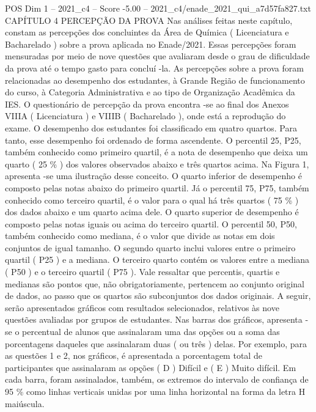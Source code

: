 \begin{textsample}{POS Dim 1 – 2021\_c4 – Score -5.00 – 2021\_c4/enade\_2021\_qui\_a7d57fa827.txt}  \label{ex:f1_pos_378}
CAPÍTULO 4 PERCEPÇÃO DA PROVA Nas análises feitas neste capítulo, constam as percepções dos concluintes da Área de Química ( Licenciatura e Bacharelado ) sobre a prova aplicada no Enade/2021.
Essas percepções foram mensuradas por meio de nove questões que avaliaram desde o grau de dificuldade da prova até o tempo gasto para concluí -la.
As percepções sobre a prova foram relacionadas ao desempenho dos estudantes, à Grande Região de funcionamento do curso, à Categoria Administrativa e ao tipo de Organização Acadêmica da IES.
O questionário de percepção da prova encontra -se ao final dos Anexos VIIIA ( Licenciatura ) e VIIIB ( Bacharelado ), onde está a reprodução do exame.
O desempenho dos estudantes foi classificado em quatro quartos.
Para tanto, esse desempenho foi ordenado de forma ascendente.
O percentil 25, P25, também conhecido como primeiro quartil, é a nota de desempenho que deixa um quarto ( 25 \% ) dos valores observados abaixo e três quartos acima.
Na Figura 1, apresenta -se uma ilustração desse conceito.
O quarto inferior de desempenho é composto pelas notas abaixo do primeiro quartil.
Já o percentil 75, P75, também conhecido como terceiro quartil, é o valor para o qual há três quartos ( 75 \% ) dos dados abaixo e um quarto acima dele.
O quarto superior de desempenho é composto pelas notas iguais ou acima do terceiro quartil.
O percentil 50, P50, também conhecido como mediana, é o valor que divide as notas em dois conjuntos de igual tamanho.
O segundo quarto inclui valores entre o primeiro quartil ( P25 ) e a mediana.
O terceiro quarto contém os valores entre a mediana ( P50 ) e o terceiro quartil ( P75 ).
Vale ressaltar que percentis, quartis e medianas são pontos que, não obrigatoriamente, pertencem ao conjunto original de dados, ao passo que os quartos são subconjuntos dos dados originais.
A seguir, serão apresentados gráficos com resultados selecionados, relativos às nove questões avaliadas por grupos de estudantes.
Nas barras dos gráficos, apresenta -se o percentual de alunos que assinalaram uma das opções ou a soma das porcentagens daqueles que assinalaram duas ( ou três ) delas.
Por exemplo, para as questões 1 e 2, nos gráficos, é apresentada a porcentagem total de participantes que assinalaram as opções ( D ) Difícil e ( E ) Muito difícil.
Em cada barra, foram assinalados, também, os extremos do intervalo de confiança de 95 \% como linhas verticais unidas por uma linha horizontal na forma da letra H maiúscula.

\end{textsample}
